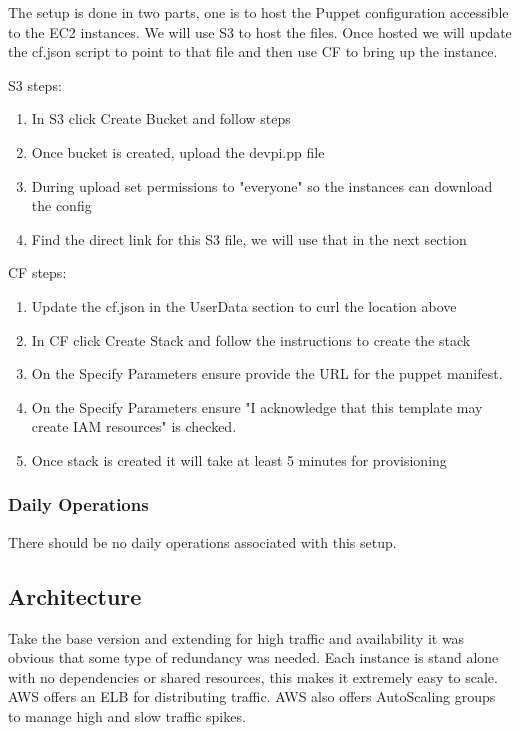 \documentclass[12pt, letterpaper]{article}
\begin{document}
The setup is done in two parts, one is to host the Puppet configuration accessible to the EC2 instances. We will use
S3 to host the files. Once hosted we will update the cf.json script to point to that file and then use CF to bring
up the instance.

S3 steps:
\begin{enumerate}
    \item In S3 click Create Bucket and follow steps
    \item Once bucket is created, upload the devpi.pp file
    \item During upload set permissions to "everyone" so the instances can download the config
    \item Find the direct link for this S3 file, we will use that in the next section
\end{enumerate}

CF steps:
\begin{enumerate}
    \item Update the cf.json in the UserData section to curl the location above
    \item In CF click Create Stack and follow the instructions to create the stack
    \item On the Specify Parameters ensure provide the URL for the puppet manifest.  
    \item On the Specify Parameters ensure "I acknowledge that this template may create IAM resources" is checked.  
    \item Once stack is created it will take at least 5 minutes for provisioning
\end{enumerate}

\subsubsection{Daily Operations}
There should be no daily operations associated with this setup.

\subsection{Architecture}
Take the base version and extending for high traffic and availability it was obvious that some type of redundancy was needed. 
Each instance is stand alone with no dependencies or shared resources, this makes it extremely easy to scale. AWS offers an 
ELB for distributing traffic. AWS also offers AutoScaling groups to manage high and slow traffic spikes.
\end{document}
